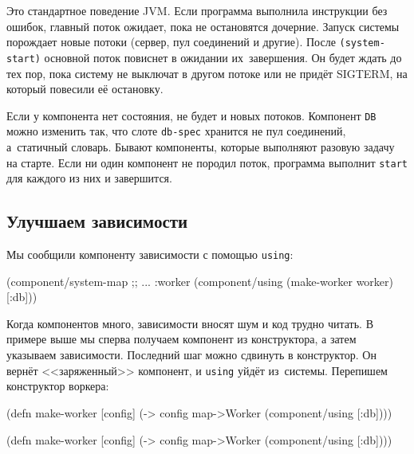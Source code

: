 
Это стандартное поведение JVM. Если программа выполнила инструкции без ошибок,
главный поток ожидает, пока не остановятся дочерние. Запуск системы порождает
новые потоки (сервер, пул соединений и другие). После \verb|(system-start)|
основной поток повиснет в ожидании их~завершения. Он будет ждать до тех пор,
пока систему не выключат в другом потоке или не придёт SIGTERM, на который
повесили её остановку.

Если у компонента нет состояния, не будет и новых потоков. Компонент \verb|DB|
можно изменить так, что слоте \verb|db-spec| хранится не пул соединений,
а~статичный словарь. Бывают компоненты, которые выполняют разовую задачу на
старте. Если ни один компонент не породил поток, программа выполнит \verb|start|
для каждого из них и завершится.

\subsection{Улучшаем зависимости}


Мы сообщили компоненту зависимости с помощью \verb|using|:

\begin{english}
  \begin{clojure}
(component/system-map
 ;; ...
 :worker (component/using
          (make-worker worker) [:db]))
  \end{clojure}
\end{english}

Когда компонентов много, зависимости вносят шум и код трудно читать. В примере
выше мы сперва получаем компонент из конструктора, а затем указываем
зависимости. Последний шаг можно сдвинуть в конструктор. Он вернёт
<<заряженный>> компонент, и \verb|using| уйдёт из~системы. Перепишем конструктор
воркера:

\ifnarrow

\begin{english}
  \begin{clojure}
(defn make-worker [config]
  (-> config
      map->Worker
      (component/using [:db])))
  \end{clojure}
\end{english}

\else

\begin{english}
  \begin{clojure}
(defn make-worker [config]
  (-> config map->Worker (component/using [:db])))
  \end{clojure}
\end{english}

